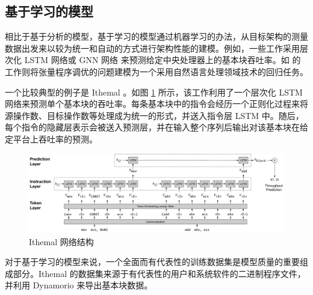 \subsection{基于学习的模型}


相比于基于分析的模型，基于学习的模型通过机器学习的办法，从目标架构的测量数据出发来以较为统一和自动的方式进行架构性能的建模。例如，一些工作采用层次化 LSTM 网络或 GNN 网络 \cite{pmlr-v97-mendis19a, 9975403}来预测给定中央处理器上的基本块吞吐率。如 \citet{10.1145/3575693.3575737} 的工作则将张量程序调优的问题建模为一个采用自然语言处理领域技术的回归任务。

一个比较典型的例子是 Ithemal \cite{pmlr-v97-mendis19a}。如图 \ref{fig:ithemal_overall} 所示，该工作利用了一个层次化 LSTM 网络来预测单个基本块的吞吐率。每条基本块中的指令会经历一个正则化过程来将源操作数、目标操作数等处理成为统一的形式，并送入指令层 LSTM 中。随后，每个指令的隐藏层表示会被送入预测层，并在输入整个序列后输出对该基本块在给定平台上吞吐率的预测。

\begin{figure}[ht]
  \centering
  \includegraphics[width=\textwidth]{figures/diag_fullsystem.pdf}
  \vspace{-20pt}
  \caption{Ithemal 网络结构\cite{pmlr-v97-mendis19a}}
  \label{fig:ithemal_overall}
\end{figure}

对于基于学习的模型来说，一个全面而有代表性的训练数据集是模型质量的重要组成部分。Ithemal 的数据集来源于有代表性的用户和系统软件的二进制程序文件，并利用 Dynamorio \cite{10.1145/2365864.2151043} 来导出基本块数据。

